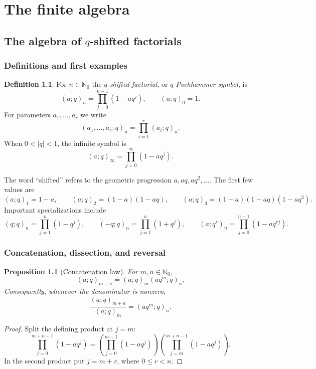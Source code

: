 \documentclass[11pt,oneside,openany]{book}
\newtheorem{proposition}[theorem]{Proposition}
\theoremstyle{definition}
\newtheorem{definition}[theorem]{Definition}
\theoremstyle{remark}
\newcommand{\N}{\mathbb N}
\newcommand{\abs}[1]{\lvert #1\rvert}
\begin{document}
\tableofcontents

\mainmatter

\part{The finite algebra}

\chapter{The algebra of \texorpdfstring{$q$}{q}-shifted factorials}\label{chap:pochhammer}

\section{Definitions and first examples}

\begin{definition}
For $n\in\N_0$ the \emph{$q$-shifted factorial}, or \emph{$q$-Pochhammer symbol}, is
\[
 (a;q)_n=\prod_{j=0}^{n-1}(1-aq^j),\qquad (a;q)_0=1.
\]
For parameters $a_1,\dots,a_r$ we write
\[
 (a_1,\dots,a_r;q)_n=\prod_{i=1}^r(a_i;q)_n.
\]
When $0<\abs q<1$, the infinite symbol is
\[
 (a;q)_\infty=\prod_{j=0}^{\infty}(1-aq^j).
\]
\end{definition}

The word ``shifted'' refers to the geometric progression $a,aq,aq^2,\ldots$.  The first few values are
\[
 (a;q)_1=1-a,
 \qquad
 (a;q)_2=(1-a)(1-aq),
 \qquad
 (a;q)_3=(1-a)(1-aq)(1-aq^2).
\]
Important specializations include
\[
 (q;q)_n=\prod_{j=1}^n(1-q^j),
 \qquad
 (-q;q)_n=\prod_{j=1}^n(1+q^j),
 \qquad
 (a;q^r)_n=\prod_{j=0}^{n-1}(1-aq^{rj}).
\]

\section{Concatenation, dissection, and reversal}

\begin{proposition}[Concatenation law]\label{prop:concat}
For $m,n\in\N_0$,
\[
 (a;q)_{m+n}=(a;q)_m(aq^m;q)_n.
\]
Consequently, whenever the denominator is nonzero,
\[
 \frac{(a;q)_{m+n}}{(a;q)_m}=(aq^m;q)_n.
\]
\end{proposition}

\begin{proof}
Split the defining product at $j=m$:
\[
 \prod_{j=0}^{m+n-1}(1-aq^j)
 =\left(\prod_{j=0}^{m-1}(1-aq^j)\right)
  \left(\prod_{j=m}^{m+n-1}(1-aq^j)\right).
\]
In the second product put $j=m+r$, where $0\le r<n$.
\end{proof}
\end{document}
